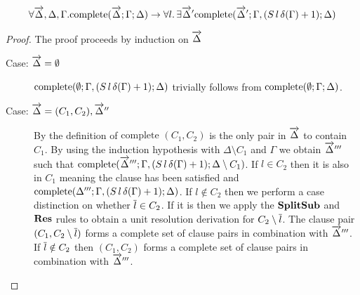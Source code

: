 \begin{mylemma}\label{lem:compsplit}
\begin{align*}\forall \overrightarrow{\Delta},\Delta,\Gamma.  \mathrm{complete}(\overrightarrow{\Delta};\Gamma; \Delta) \to \forall l. \, \exists \overrightarrow{\Delta}' \mathrm{complete}(\overrightarrow{\Delta}';\Gamma, (S \, l \, \delta(\Gamma) + 1); \Delta)
\end{align*}
\begin{proof}
The proof proceeds by induction on $\overrightarrow{\Delta}$
\begin{description}
\item[Case: $\overrightarrow{\Delta} = \emptyset$] 
$\mathrm{complete}(\emptyset;\Gamma, (S \, l \, \delta(\Gamma) + 1); \Delta)$ trivially follows from $\mathrm{complete}(\emptyset;\Gamma; \Delta)$.
\item[Case: $\overrightarrow{\Delta} = (C_1,C_2),\overrightarrow{\Delta}''$]
By the definition of $\mathrm{complete}$ $(C_1, C_2)$ is the only pair in $\overrightarrow{\Delta}$ to contain $C_1$.  By using the induction hypothesis with $\Delta \setminus C_1$ and $\Gamma$ we obtain $\overrightarrow{\Delta}'''$ such that $\mathrm{complete}(\overrightarrow{\Delta}''';\Gamma, (S \, l \, \delta(\Gamma) + 1); \Delta \setminus C_1)$.  If $l \in C_2$ then it is also in $C_1$ meaning the clause has been satisfied and $\mathrm{complete}(\Delta''';\Gamma, (S \, l \, \delta(\Gamma) + 1); \Delta)$. If $l \notin C_2$ then we perform a case distinction on whether $\overline{l} \in C_2$. If it is then we apply the $\mathbf{SplitSub}$ and $\mathbf{Res}$ rules to obtain a unit resolution derivation for $C_2 \setminus \overline{l}$. The clause pair $(C_1,C_2 \setminus \overline{l})$ forms a complete set of clause pairs in combination with $\overrightarrow{\Delta}'''$. If $\overline{l} \notin C_2$ then $(C_1,C_2)$ forms a complete set of clause pairs in combination with $\overrightarrow{\Delta}'''$.

\end{description}
\end{proof}

\end{mylemma}

